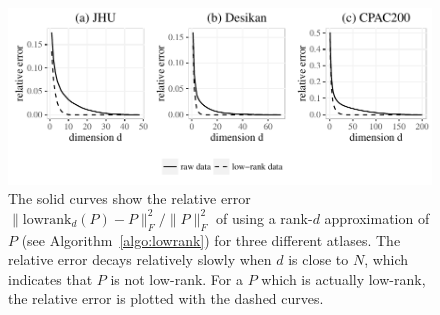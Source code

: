 \documentclass[journal,twoside,web]{ieeecolor}
\begin{document}
\begin{figure}[!htbp]
\centering
\includegraphics[width=\linewidth]{screeplot_ratio_all.pdf}
\caption{
The solid curves show the relative error $\|\mathrm{lowrank}_d(P)-P\|_F^2/\|P\|_F^2$ of using a rank-$d$ approximation of $P$ (see Algorithm~\ref{algo:lowrank}) for three different atlases.
The relative error decays relatively slowly when $d$ is close to $N$, which indicates that $P$ is not low-rank.
For a $P$ which is actually low-rank, the relative error is plotted with the dashed curves.}
\label{fig:screeplot}
\end{figure}


\end{document}
